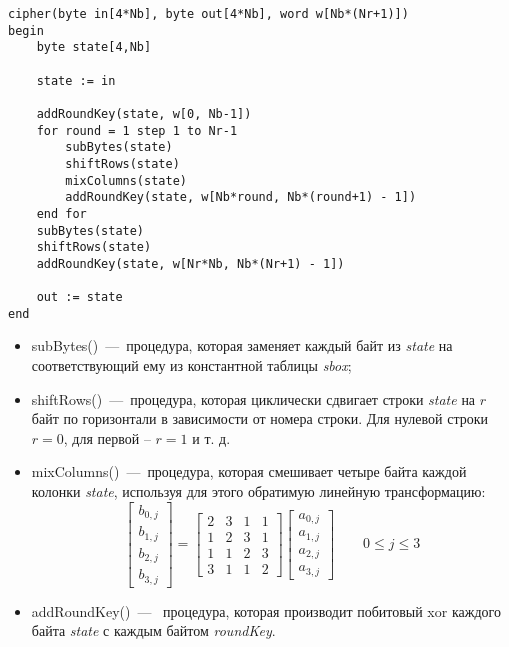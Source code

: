 \documentclass[utf8x, 14pt, bold, times]{G7-32} %
\begin{document}
\begin{lstlisting}[style=pseudocode]
cipher(byte in[4*Nb], byte out[4*Nb], word w[Nb*(Nr+1)])
begin
    byte state[4,Nb]
    
    state := in

    addRoundKey(state, w[0, Nb-1])
    for round = 1 step 1 to Nr-1
        subBytes(state)
        shiftRows(state)
        mixColumns(state)
        addRoundKey(state, w[Nb*round, Nb*(round+1) - 1])
    end for
    subBytes(state)
    shiftRows(state)
    addRoundKey(state, w[Nr*Nb, Nb*(Nr+1) - 1])

    out := state
end
\end{lstlisting}

\begin{itemize}
\item subBytes()~---~процедура, которая заменяет каждый байт из \textsl{state} на
      соответствующий ему из константной таблицы \textsl{sbox};
\item shiftRows()~---~процедура, которая циклически сдвигает строки \textsl{state} на $r$ байт
      по горизонтали в зависимости от номера строки. Для нулевой строки $r = 0$, для
      первой -- $r = 1$ и т. д.
\item mixColumns()~---~процедура, которая смешивает четыре байта каждой колонки
      \textsl{state}, используя для этого обратимую линейную трансформацию:
      $$
      \begin{bmatrix}
        b_{0,j} \\
        b_{1,j} \\
        b_{2,j} \\
        b_{3,j}
      \end{bmatrix}
        =
      \begin{bmatrix}
        2 & 3 & 1 & 1 \\
        1 & 2 & 3 & 1 \\
        1 & 1 & 2 & 3 \\
        3 & 1 & 1 & 2
      \end{bmatrix}
      \begin{bmatrix}
        a_{0,j} \\
        a_{1,j} \\
        a_{2,j} \\
        a_{3,j}
     \end{bmatrix}
     \qquad 0\leq j\leq 3
     $$
\item addRoundKey()~---~ процедура, которая производит побитовый xor каждого
      байта \textsl{state} с каждым байтом \textsl{roundKey}. 
\end{itemize}
\end{document}
